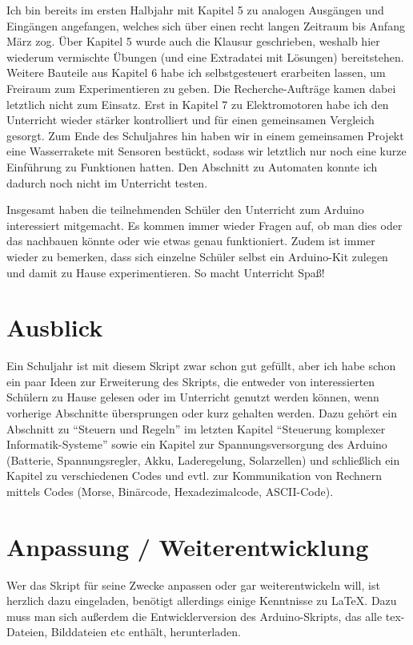 Ich bin bereits im ersten Halbjahr mit Kapitel 5 zu analogen Ausgängen und Eingängen angefangen, welches sich über einen recht langen Zeitraum bis Anfang März zog. Über Kapitel 5 wurde auch die Klausur geschrieben, weshalb hier wiederum vermischte Übungen (und eine Extradatei mit Lösungen) bereitstehen. Weitere Bauteile aus Kapitel 6 habe ich selbstgesteuert erarbeiten lassen, um Freiraum zum Experimentieren zu geben. Die Recherche-Aufträge kamen dabei letztlich nicht zum Einsatz. Erst in Kapitel 7 zu Elektromotoren habe ich den Unterricht wieder stärker kontrolliert und für einen gemeinsamen Vergleich gesorgt. Zum Ende des Schuljahres hin haben wir in einem gemeinsamen Projekt eine Wasserrakete mit Sensoren bestückt, sodass wir letztlich nur noch eine kurze Einführung zu Funktionen hatten. Den Abschnitt zu Automaten konnte ich dadurch noch nicht im Unterricht testen.

Insgesamt haben die teilnehmenden Schüler den Unterricht zum Arduino interessiert mitgemacht. Es kommen immer wieder Fragen auf, ob man dies oder das nachbauen könnte oder wie etwas genau funktioniert. Zudem ist immer wieder zu bemerken, dass sich einzelne Schüler selbst ein Arduino-Kit zulegen und damit zu Hause experimentieren. So macht Unterricht Spaß!

\section{Ausblick}

Ein Schuljahr ist mit diesem Skript zwar schon gut gefüllt, aber ich habe schon ein paar Ideen zur Erweiterung des Skripts, die entweder von interessierten Schülern zu Hause gelesen oder im Unterricht genutzt werden können, wenn vorherige Abschnitte übersprungen oder kurz gehalten werden. Dazu gehört ein Abschnitt zu \enquote{Steuern und Regeln} im letzten Kapitel \enquote{Steuerung komplexer Informatik-Systeme} sowie ein Kapitel zur Spannungsversorgung des Arduino (Batterie, Spannungsregler, Akku, Laderegelung, Solarzellen) und schließlich ein Kapitel zu verschiedenen Codes und evtl. zur Kommunikation von Rechnern mittels Codes (Morse, Binärcode, Hexadezimalcode, ASCII-Code).

\section{Anpassung / Weiterentwicklung}

Wer das Skript für seine Zwecke anpassen oder gar weiterentwickeln will, ist herzlich dazu eingeladen, benötigt allerdings einige Kenntnisse zu \LaTeX. Dazu muss man sich außerdem die Entwicklerversion des Arduino-Skripts, das alle tex-Dateien, Bilddateien etc enthält, herunterladen.


